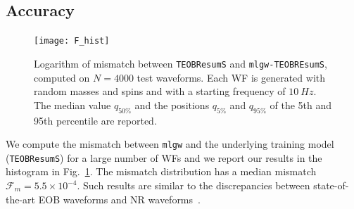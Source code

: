 \subsection{Accuracy}
\begin{figure}
	\centering
    \texttt{[image: F\_hist]}
	\caption{Logarithm of mismatch between \texttt{TEOBResumS} and \texttt{mlgw-TEOBREsumS}, computed on $N=4000$ test waveforms. 
	Each WF is generated with random masses and spins and with a starting frequency of $\SI{10}{Hz}$.
	The median value $q_{50\%}$ and the positions $q_{5\%}$ and $q_{95\%}$ of the 5th and 95th percentile are reported.
}
	\label{fig:F_hist}
\end{figure}
We compute the mismatch between \texttt{mlgw} and the underlying training model (\texttt{TEOBResumS}) for a large number of WFs
and we report our results in the histogram in Fig.~\ref{fig:F_hist}. The mismatch distribution has 
a median mismatch ${\mathcal{F}_m = 5.5 \times {10^{-4}}}$. Such results are similar to the discrepancies 
between state-of-the-art EOB waveforms and NR waveforms~\cite{Bohe:2016gbl, Nagar:2018zoe, Nagar:2020pcj}.

